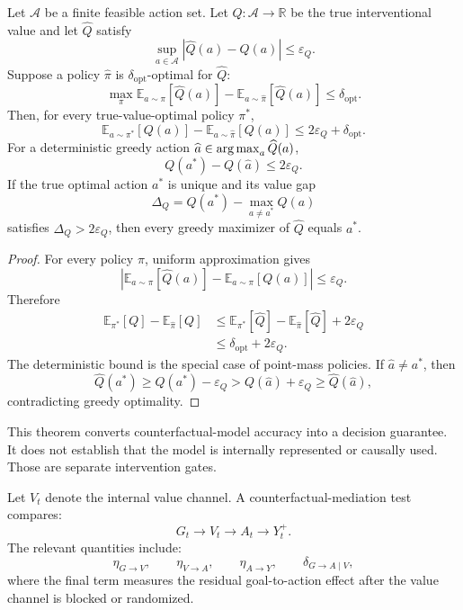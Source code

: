 \begin{theorem}
\label{thm:counterfactual-policy}
Let \(\mathcal A\) be a finite feasible action set. Let \(Q:\mathcal A\to
\mathbb R\) be the true interventional value and let \(\widehat Q\) satisfy
\[
\sup_{a\in\mathcal A}|\widehat Q(a)-Q(a)|\leq\varepsilon_Q.
\]
Suppose a policy \(\widehat\pi\) is \(\delta_{\mathrm{opt}}\)-optimal for
\(\widehat Q\):
\[
\max_{\pi}
\mathbb E_{a\sim\pi}[\widehat Q(a)]
-
\mathbb E_{a\sim\widehat\pi}[\widehat Q(a)]
\leq
\delta_{\mathrm{opt}}.
\]
Then, for every true-value-optimal policy \(\pi^*\),
\[
\boxed{
\mathbb E_{a\sim\pi^*}[Q(a)]
-
\mathbb E_{a\sim\widehat\pi}[Q(a)]
\leq
2\varepsilon_Q+\delta_{\mathrm{opt}}.
}
\]
For a deterministic greedy action \(\widehat a\in\operatorname*{arg\,max}_a\widehat Q(a)\),
\[
Q(a^*)-Q(\widehat a)
\leq2\varepsilon_Q.
\]
If the true optimal action \(a^*\) is unique and its value gap
\[
\Delta_Q
=
Q(a^*)-
\max_{a\neq a^*}Q(a)
\]
satisfies \(\Delta_Q>2\varepsilon_Q\), then every greedy maximizer of
\(\widehat Q\) equals \(a^*\).
\end{theorem}

\begin{proof}
For every policy \(\pi\), uniform approximation gives
\[
\left|
\mathbb E_{a\sim\pi}[\widehat Q(a)]
-
\mathbb E_{a\sim\pi}[Q(a)]
\right|
\leq\varepsilon_Q.
\]
Therefore
\[
\begin{aligned}
\mathbb E_{\pi^*}[Q]
-
\mathbb E_{\widehat\pi}[Q]
&\leq
\mathbb E_{\pi^*}[\widehat Q]
-
\mathbb E_{\widehat\pi}[\widehat Q]
+2\varepsilon_Q\\
&\leq
\delta_{\mathrm{opt}}+2\varepsilon_Q.
\end{aligned}
\]
The deterministic bound is the special case of point-mass policies. If
\(\widehat a\neq a^*\), then
\[
\widehat Q(a^*)
\geq
Q(a^*)-\varepsilon_Q
>
Q(\widehat a)+\varepsilon_Q
\geq
\widehat Q(\widehat a),
\]
contradicting greedy optimality.
\end{proof}

This theorem converts counterfactual-model accuracy into a decision guarantee.
It does not establish that the model is internally represented or causally
used. Those are separate intervention gates.


Let \(V_t\) denote the internal value channel. A counterfactual-mediation test
compares:
\[
G_t
\longrightarrow
V_t
\longrightarrow
A_t
\longrightarrow
Y_t^+.
\]
The relevant quantities include:
\[
\eta_{G\to V},
\qquad
\eta_{V\to A},
\qquad
\eta_{A\to Y},
\qquad
\delta_{G\to A\mid V},
\]
where the final term measures the residual goal-to-action effect after the
value channel is blocked or randomized.

